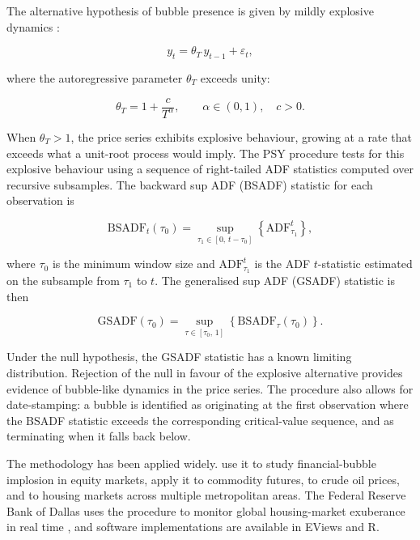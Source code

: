 The alternative hypothesis of bubble presence is given by mildly explosive dynamics \citep{phillipsMagdalinos2007}:

\begin{equation}
y_t = \theta_T \, y_{t-1} + \varepsilon_t,
\label{eq:psy-alternative}
\end{equation}

\noindent where the autoregressive parameter $\theta_T$ exceeds unity:

\begin{equation}
\theta_T = 1 + \frac{c}{T^{\alpha}}, \qquad \alpha \in (0,1), \quad c > 0.
\label{eq:mildly-explosive-root}
\end{equation}

\noindent When $\theta_T > 1$, the price series exhibits explosive behaviour, growing at a rate that exceeds what a unit-root process would imply. The PSY procedure tests for this explosive behaviour using a sequence of right-tailed ADF statistics computed over recursive subsamples. The backward sup ADF (BSADF) statistic for each observation is

\begin{equation}
\text{BSADF}_t(\tau_0) = \sup_{\tau_1 \in [0,\, t - \tau_0]} \left\{ \text{ADF}_{\tau_1}^{t} \right\},
\label{eq:bsadf}
\end{equation}

\noindent where $\tau_0$ is the minimum window size and $\text{ADF}_{\tau_1}^{t}$ is the ADF $t$-statistic estimated on the subsample from $\tau_1$ to $t$. The generalised sup ADF (GSADF) statistic is then

\begin{equation}
\text{GSADF}(\tau_0) = \sup_{\tau \in [\tau_0,\, 1]} \left\{ \text{BSADF}_\tau(\tau_0) \right\}.
\label{eq:gsadf}
\end{equation}

Under the null hypothesis, the GSADF statistic has a known limiting distribution. Rejection of the null in favour of the explosive alternative provides evidence of bubble-like dynamics in the price series. The procedure also allows for date-stamping: a bubble is identified as originating at the first observation where the BSADF statistic exceeds the corresponding critical-value sequence, and as terminating when it falls back below.

The methodology has been applied widely. \citet{phillipsShi2018} use it to study financial-bubble implosion in equity markets, \citet{etienneIrwinGarcia2015} apply it to commodity futures, \citet{caspiKatzkeGupta2018} to crude oil prices, and \citet{pavlidisEtAl2016} to housing markets across multiple metropolitan areas. The Federal Reserve Bank of Dallas uses the procedure to monitor global housing-market exuberance in real time \citep{phillipsShi2020}, and software implementations are available in EViews and R.

